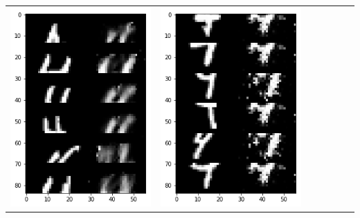\documentclass[12pt]{report} %
\begin{document}
\begin{tabular}{m{0.7cm}m{2.4cm}m{2.4cm}m{2.4cm}m{2.4cm}m{2.4cm}m{2.4cm}}
\includegraphics[scale=0.3]{pictures/M1_4_up.png} & \includegraphics[scale=0.3]{pictures/M1_4_down.png} &

\end{tabular}
\end{document}
